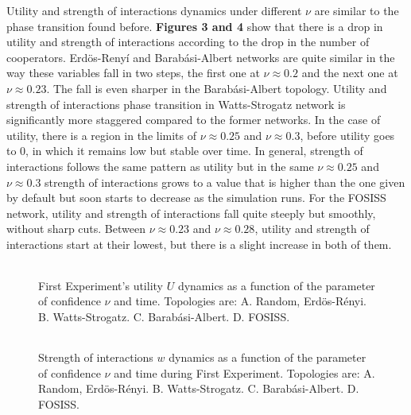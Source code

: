\documentclass{bmcart}
\def\texttt{[image: ]}
\begin{document}

Utility and strength of interactions dynamics under different $\nu$ are
similar to the phase transition found before. \textbf{Figures 3 and 4}
show that there is a drop in utility and strength of interactions
according to the drop in the number of cooperators. Erd\"{o}s-Reny\'i
and Barab\'asi-Albert networks are quite similar in the way these
variables fall in two steps, the first one at $\nu \approx 0.2$ and
the next one at $\nu \approx 0.23$. The fall is even sharper in the
Barab\'asi-Albert topology. Utility and strength of interactions phase
transition in Watts-Strogatz network is significantly more staggered
compared to the former networks. In the case of utility, there is a
region in the limits of $\nu \approx 0.25$ and $\nu \approx 0.3$,
before utility goes to $0$, in which it remains low but stable over
time. In general, strength of interactions follows the same pattern as
utility but in the same $\nu \approx 0.25$ and $\nu \approx 0.3$
strength of interactions grows to a value that is higher than the one
given by default but soon starts to decrease as the simulation
runs. For the FOSISS network, utility and strength of interactions fall
quite steeply but smoothly, without sharp cuts. Between
$\nu \approx 0.23$ and $\nu \approx 0.28$, utility and strength of
interactions start at their lowest,
but there is a slight increase in both of them.\\


\begin{figure} [h!]
\centering
\begin{tabular}{cc}

\end{tabular}
\caption{First Experiment's utility $U$ dynamics as a function of the parameter
  of confidence $\nu$ and time. Topologies are: A. Random, Erd\"{o}s-R\'enyi. B. Watts-Strogatz. C. Barab\'asi-Albert. D. FOSISS.}\label{fitness}
\end{figure}



\begin{figure} [h!]
\centering
\begin{tabular}{cc}

\end{tabular}
\caption{Strength of interactions $w$ dynamics as a function of the parameter
  of confidence $\nu$ and time during First Experiment. Topologies are:
  A. Random, Erd\"{o}s-R\'enyi. B. Watts-Strogatz. C. Barab\'asi-Albert. D. FOSISS.}\label{trust}  
\end{figure} 
\end{document}
